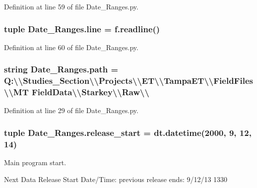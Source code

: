 Definition at line 59 of file Date\+\_\+\+Ranges.\+py.

\hypertarget{namespace_date___ranges_a62b9a1723ddacde8e439cbd75285a050}{}
\subsubsection[{line}]{\setlength{\rightskip}{0pt plus 5cm}tuple Date\+\_\+\+Ranges.\+line = f.\+readline()}\label{namespace_date___ranges_a62b9a1723ddacde8e439cbd75285a050}


Definition at line 60 of file Date\+\_\+\+Ranges.\+py.

\hypertarget{namespace_date___ranges_aa526c3131e65944170a04293caf94a27}{}
\subsubsection[{path}]{\setlength{\rightskip}{0pt plus 5cm}string Date\+\_\+\+Ranges.\+path = \textquotesingle{}Q\+:\textbackslash{}\textbackslash{}\+Studies\+\_\+\+Section\textbackslash{}\textbackslash{}\+Projects\textbackslash{}\textbackslash{}\+E\+T\textbackslash{}\textbackslash{}\+Tampa\+E\+T\textbackslash{}\textbackslash{}\+Field\+Files\textbackslash{}\textbackslash{}\+M\+T Field\+Data\textbackslash{}\textbackslash{}\+Starkey\textbackslash{}\textbackslash{}\+Raw\textbackslash{}\textbackslash{}\textquotesingle{}}\label{namespace_date___ranges_aa526c3131e65944170a04293caf94a27}


Definition at line 29 of file Date\+\_\+\+Ranges.\+py.

\hypertarget{namespace_date___ranges_a3166246a888c28029ade73f791a9a47b}{}
\subsubsection[{release\+\_\+start}]{\setlength{\rightskip}{0pt plus 5cm}tuple Date\+\_\+\+Ranges.\+release\+\_\+start = dt.\+datetime(2000, 9, 12, 14)}\label{namespace_date___ranges_a3166246a888c28029ade73f791a9a47b}


Main program start. 

Next Data Release Start Date/\+Time\+: previous release ends\+: 9/12/13 1330 

